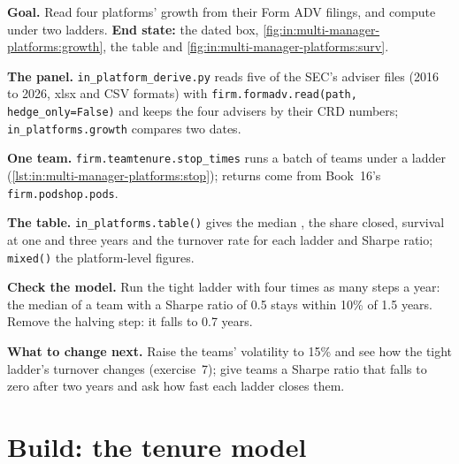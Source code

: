 \begin{tutorial}
\textbf{Goal.} Read four platforms' growth from their Form ADV filings, and compute  under two ladders.
\textbf{End state:} the dated box, \cref{fig:in:multi-manager-platforms:growth}, the  table and
\cref{fig:in:multi-manager-platforms:surv}.
\begin{tutsteps}
\item \textbf{The panel.} \texttt{in\_platform\_derive.py} reads five of the SEC's adviser files (2016 to 2026, xlsx and
CSV formats) with \texttt{firm.formadv.read(path, hedge\_only=False)} and keeps the four advisers by their CRD numbers;
\texttt{in\_platforms.growth} compares two dates.
\item \textbf{One team.} \texttt{firm.teamtenure.stop\_times} runs a batch of teams under a ladder
(\cref{lst:in:multi-manager-platforms:stop}); returns come from Book~16's \texttt{firm.podshop.pods}.
\label{lst:in:multi-manager-platforms:stop}
\item \textbf{The table.} \texttt{in\_platforms.table()} gives the median , the share closed, survival at one and
three years and the turnover rate for each ladder and Sharpe ratio; \texttt{mixed()} the platform-level figures.
\item \textbf{Check the model.} Run the tight ladder with four times as many steps a year: the median  of a team
with a Sharpe ratio of 0.5 stays within 10\% of 1.5 years. Remove the halving step: it falls to 0.7 years.
\end{tutsteps}
\end{tutorial}

\textbf{What to change next.} Raise the teams' volatility to 15\% and see how the tight ladder's turnover changes
(exercise~7); give teams a Sharpe ratio that falls to zero after two years and ask how fast each ladder closes them.

\section{Build: the tenure model}\label{bld:in:multi-manager-platforms:teamtenure}

